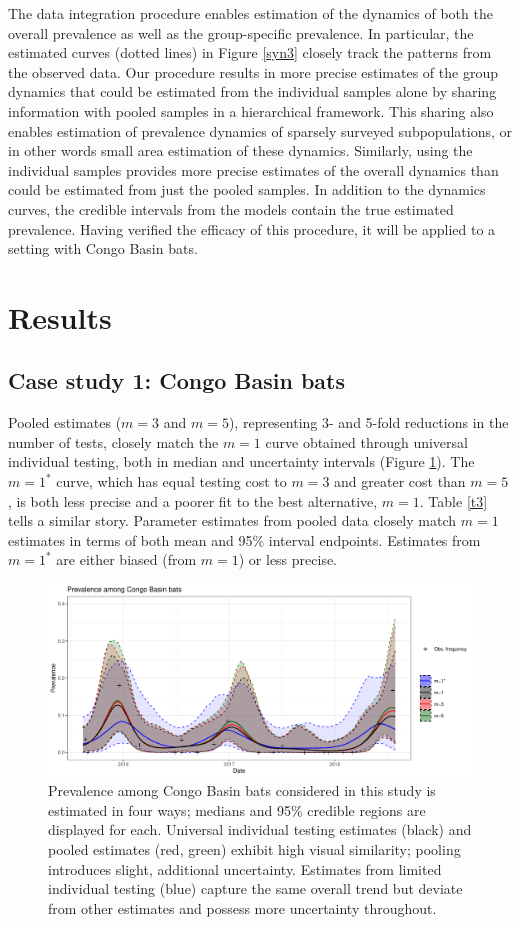 \documentclass{article}
\begin{document}
The data integration procedure enables estimation of the dynamics of both the overall prevalence as well as the group-specific prevalence. In particular, the estimated curves (dotted lines) in Figure \ref{syn3} closely track the patterns from the observed data. Our procedure results in more precise estimates of the group dynamics that could be estimated from the individual samples alone by sharing information with pooled samples in a hierarchical framework. This sharing also enables estimation of prevalence dynamics of sparsely surveyed subpopulations, or in other words small area estimation of these dynamics. Similarly, using the individual samples provides more precise estimates of the overall dynamics than could be estimated from just the pooled samples. In addition to the dynamics curves, the credible intervals from the models contain the true estimated prevalence. Having verified the efficacy of this procedure, it will be applied to a setting with Congo Basin bats.

\section{Results}

\subsection{Case study 1: Congo Basin bats}

Pooled estimates ($m=3$ and $m=5$), representing 3- and 5-fold reductions in the number of tests, closely match the $m=1$ curve obtained through universal individual testing, both in median and uncertainty intervals (Figure \ref{fig2}). The $m=1^*$ curve, which has equal testing cost to $m=3$ and greater cost than $m=5$, is both less precise and a poorer fit to the best alternative, $m=1$.
Table \ref{t3} tells a similar story. Parameter estimates from pooled data closely match $m=1$ estimates in terms of both mean and 95\% interval endpoints. Estimates from $m=1^*$ are either biased (from $m=1$) or less precise. 

\begin{figure}[h!]
\centerline{\includegraphics[width=.8\textwidth]{Figure2.pdf}}
\caption{Prevalence among Congo Basin bats considered in this study is estimated in four ways; medians and 95\% credible regions are displayed for each. Universal individual testing estimates (black) and pooled estimates (red, green) exhibit high visual similarity; pooling introduces slight, additional uncertainty. Estimates from limited individual testing (blue) capture the same overall trend but deviate from other estimates and possess more uncertainty throughout. \label{fig2}}
\end{figure}
\end{document}
